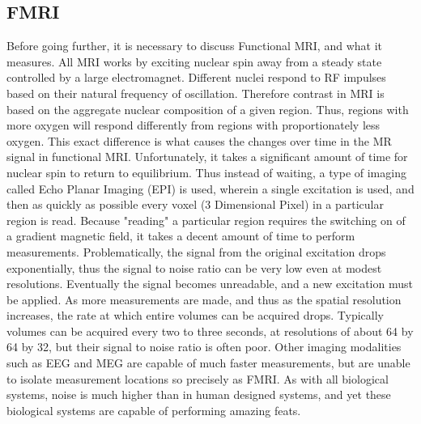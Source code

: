 \documentclass{article}
\begin{document}
\subsection*{FMRI}
Before going further, it is necessary to discuss Functional MRI,
and what it measures. All MRI works by exciting nuclear spin away
from a steady state controlled by a large electromagnet. Different 
nuclei respond to RF impulses based on their natural frequency
of oscillation. Therefore contrast in MRI is based on the aggregate
nuclear composition of a given region. Thus, regions with more oxygen
will respond differently from regions with proportionately less 
oxygen. This exact difference is what causes the changes over time
in the MR signal in functional MRI. Unfortunately, it takes a significant
amount of time for nuclear spin to return to equilibrium. Thus instead
of waiting, a type of imaging called Echo Planar Imaging (EPI) is used,
wherein a single excitation is used, and then as quickly as possible
every voxel (3 Dimensional Pixel) in a particular region is read. 
Because "reading" a particular region requires the switching on of a
gradient magnetic field, it takes a decent amount of time to perform
measurements. Problematically, the signal from the original excitation
drops exponentially, thus the signal to noise ratio can be very low
even at modest resolutions. Eventually the signal becomes unreadable,
and a new excitation must be applied. As more measurements are made, and thus
as the spatial resolution increases, the rate at which entire volumes
can be acquired drops. Typically volumes can be acquired every two to
three seconds, at resolutions of about 64 by 64 by 32, but their signal
to noise ratio is often poor. Other imaging modalities such as EEG and
MEG are capable of much faster measurements, but are unable to isolate
measurement locations so precisely as FMRI. As with all biological systems,
noise is much higher than in human designed systems, and yet these 
biological systems are capable of performing amazing feats.
\end{document}
